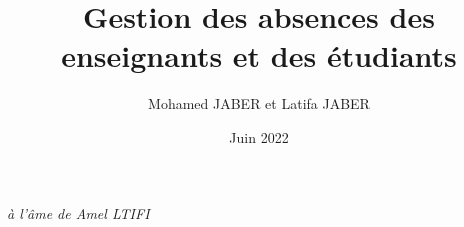 \documentclass[a4paper,12pt,oneside]{book}
\title{Gestion des absences des enseignants et des étudiants}
\author{Mohamed JABER et Latifa JABER}
\date{Juin 2022}
\begin{document}
\pagestyle{empty}  %

\maketitle 
\cleardoublepage



\null\vfill\vfill\vfill\vfill
\begin{flushright}
\Large 
\textit{à l'âme de Amel LTIFI}
\end{flushright}
\vfill\vfill\vfill\vfill\vfill\vfill\null
\cleardoublepage

\frontmatter     
 
 

\tableofcontents{\pagestyle{plain}}  %
\listoffigures{\pagestyle{plain}}  %
\listoftables
\mainmatter	  %


\dominitoc
\pagestyle{fancy}

  
 














\end{document}
